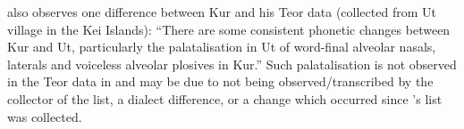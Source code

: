 \citet[84]{Hughes1987} also observes one difference between Kur
and his Teor data (collected from Ut village in the Kei Islands):
“There are some consistent phonetic changes between Kur
and Ut, particularly the palatalisation in Ut of word-final alveolar
nasals, laterals and voiceless alveolar plosives in Kur.” Such palatalisation
is not observed in the Teor data in \citet{Wallace1869}
and may be due to not being observed/transcribed by the collector
of the list, a dialect difference, or a change
which occurred since \citeauthor{Wallace1869}’s
list was collected.

